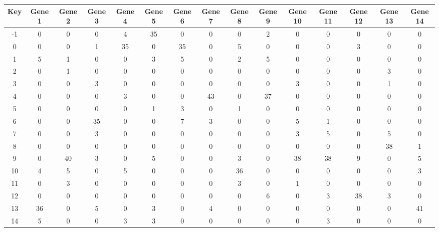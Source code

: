 \begin{tabular}{|c|c|c|c|c|c|c|c|c|c|c|c|c|c|c|}
\hline
Key & Gene 1 & Gene 2 & Gene 3 & Gene 4 & Gene 5 & Gene 6 & Gene 7 & Gene 8 & Gene 9 & Gene 10 & Gene 11 & Gene 12 & Gene 13 & Gene 14 \\
\hline
-1 & 0 & 0 & 0 & 4 & 35 & 0 & 0 & 0 & 2 & 0 & 0 & 0 & 0 & 0 \\
0 & 0 & 0 & 1 & 35 & 0 & 35 & 0 & 5 & 0 & 0 & 0 & 3 & 0 & 0 \\
1 & 5 & 1 & 0 & 0 & 3 & 5 & 0 & 2 & 5 & 0 & 0 & 0 & 0 & 0 \\
2 & 0 & 1 & 0 & 0 & 0 & 0 & 0 & 0 & 0 & 0 & 0 & 0 & 3 & 0 \\
3 & 0 & 0 & 3 & 0 & 0 & 0 & 0 & 0 & 0 & 3 & 0 & 0 & 1 & 0 \\
4 & 0 & 0 & 0 & 3 & 0 & 0 & 43 & 0 & 37 & 0 & 0 & 0 & 0 & 0 \\
5 & 0 & 0 & 0 & 0 & 1 & 3 & 0 & 1 & 0 & 0 & 0 & 0 & 0 & 0 \\
6 & 0 & 0 & 35 & 0 & 0 & 7 & 3 & 0 & 0 & 5 & 1 & 0 & 0 & 0 \\
7 & 0 & 0 & 3 & 0 & 0 & 0 & 0 & 0 & 0 & 3 & 5 & 0 & 5 & 0 \\
8 & 0 & 0 & 0 & 0 & 0 & 0 & 0 & 0 & 0 & 0 & 0 & 0 & 38 & 1 \\
9 & 0 & 40 & 3 & 0 & 5 & 0 & 0 & 3 & 0 & 38 & 38 & 9 & 0 & 5 \\
10 & 4 & 5 & 0 & 5 & 0 & 0 & 0 & 36 & 0 & 0 & 0 & 0 & 0 & 3 \\
11 & 0 & 3 & 0 & 0 & 0 & 0 & 0 & 3 & 0 & 1 & 0 & 0 & 0 & 0 \\
12 & 0 & 0 & 0 & 0 & 0 & 0 & 0 & 0 & 6 & 0 & 3 & 38 & 3 & 0 \\
13 & 36 & 0 & 5 & 0 & 3 & 0 & 4 & 0 & 0 & 0 & 0 & 0 & 0 & 41 \\
14 & 5 & 0 & 0 & 3 & 3 & 0 & 0 & 0 & 0 & 0 & 3 & 0 & 0 & 0 \\
\hline
\end{tabular}